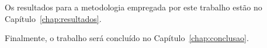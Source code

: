 
Os resultados para a metodologia empregada por este trabalho estão no
Capítulo~\ref{chap:resultados}. 

Finalmente, o trabalho será concluído no
Capítulo~\ref{chap:conclusao}.





